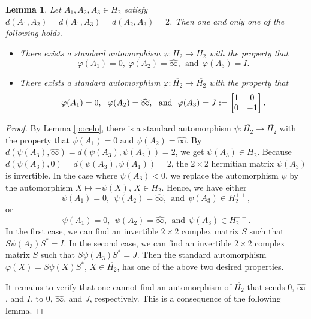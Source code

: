 \documentclass[10pt]{amsart}
\newtheorem{lemma}[theorem]{Lemma}
\theoremstyle{definition}
\theoremstyle{remark}
\numberwithin{subsection}{section}
\numberwithin{equation}{section}
\newcommand\oH{{\overline{H_2}}}
\newcommand\oi{{\widehat{\infty}}}
\begin{document}
\begin{lemma}\label{threepoints}
Let $A_1 , A_2 , A_3 \in \oH$ satisfy $d(A_1 , A_2 ) = d(A_1 , A_3 ) = d(A_2 , A_3 ) = 2$. Then one and only one of the following holds.
\begin{itemize}
\item There exists a standard automorphism $\varphi \colon \oH \to \oH$ with the property that 
\[
\varphi (A_1) = 0,\ \varphi (A_2) = \oi,\ \  \text{and}\ \  \varphi (A_3) = I.
\]
\item There exists a standard automorphism $\varphi \colon \oH \to \oH$ with the property that 
\[
\varphi (A_1) = 0,\ \ \varphi (A_2) = \oi,\ \ \text{and}\ \ \varphi (A_3) = J := \left[ \begin{matrix} 1 & 0 \cr 0 & -1 \cr \end{matrix} \right]. \index{$J$}
\]
\end{itemize}
\end{lemma}

\begin{proof}
By Lemma \ref{pocelo}, there is a standard automorphism $\psi \colon \oH \to \oH$ with the property that $\psi (A_1) = 0$ and $\psi (A_2) = \oi$. 
By $d(\psi (A_3) , \oi) = d(\psi (A_3) , \psi (A_2)) = 2$, we get $\psi (A_3)\in H_2$.
Because $d(\psi (A_3) , 0) = d(\psi (A_3) , \psi (A_1)) = 2$, the $2 \times 2$ hermitian matrix $\psi (A_3)$ is invertible.
In the case where $\psi (A_3)<0$, we replace the automorphism $\psi$ by the automorphism $X \mapsto -\psi (X)$, $X \in \oH$. Hence, we have either 
\[
\psi (A_1) = 0,\ \ \psi (A_2) = \oi,\ \ \text{and}\ \ \psi (A_3)\in H_2^{++},
\]
 or 
\[
\psi (A_1) = 0,\ \ \psi (A_2) = \oi, \ \ \text{and} \ \ \psi (A_3)\in H_2^{+-}.
\] 
In the first case, we can find an invertible $2 \times 2$ complex matrix $S$ such that $S \psi (A_3) S^\ast = I$.
In the second case, we can find an invertible $2 \times 2$ complex matrix $S$ such that $S \psi (A_3) S^\ast = J$. Then the standard automorphism $\varphi (X)= S\psi (X) S^\ast$, $X \in \oH$, has one of the above two desired properties. 

It remains to verify that one cannot find an automorphism of $\oH$ that sends $0$, ${\oi}$, and $I$, to $0$, ${\oi}$, and $J$, respectively. 
This is a consequence of the following lemma.
\end{proof}
\end{document}
